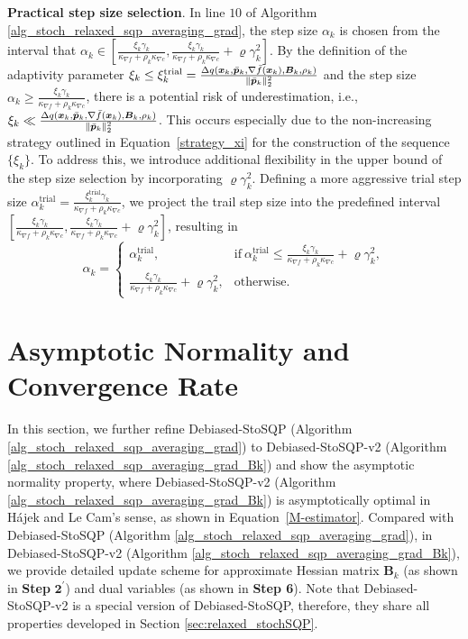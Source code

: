 \documentclass[aos]{imsart}
\numberwithin{equation}{section}
\theoremstyle{plain}
\begin{document}
\textbf{Practical step size selection}. In line $10$ of  Algorithm \ref{alg_stoch_relaxed_sqp_averaging_grad},
the step size $\alpha_k$ is chosen from the interval that $\alpha_k \in  \left[ \frac{ \xi_{k}\gamma_k}{\kappa_{\nabla f} + \rho_k \kappa_{\nabla c}} , \frac{ \xi_{k}\gamma_k}{\kappa_{\nabla f} + \rho_k \kappa_{\nabla c}} + \varrho \gamma_k^2 \right]$. 
By the definition of the adaptivity parameter $\xi_k \leq \xi_{k}^{\text{trial}} =  \frac{\Delta q(\bm{x}_k,\Bar{\bm{p}}_k, \nabla \Bar{f}(\bm{x}_k),\bm{B}_k,\rho_k)}{\|\Bar{\bm{p}}_k\|_2^2}$ and the step size $\alpha_k \geq \frac{ \xi_{k}\gamma_k}{\kappa_{\nabla f} + \rho_k \kappa_{\nabla c}} $, there is a potential risk of underestimation, i.e., $\xi_k \ll  \frac{\Delta q(\bm{x}_k,\Bar{\bm{p}}_k, \nabla \Bar{f}(\bm{x}_k),\bm{B}_k,\rho_k)}{\|\Bar{\bm{p}}_k\|_2^2}$. This occurs especially due to the non-increasing strategy outlined in Equation~\eqref{strategy_xi}
for the construction of the sequence $\{\xi_k\}$. To address this, we introduce additional flexibility in the upper bound of the step size selection by incorporating $\varrho \gamma_k^2$. Defining a more aggressive trial step size $\alpha_k^{\text{trial}} =  \frac{ \xi_{k}^{\text{trial}}\gamma_k}{\kappa_{\nabla f} + \rho_k \kappa_{\nabla c}} $, we project the trail step size into the predefined interval $\left[ \frac{ \xi_{k}\gamma_k}{\kappa_{\nabla f} + \rho_k \kappa_{\nabla c}}, \frac{ \xi_{k}\gamma_k}{\kappa_{\nabla f} + \rho_k \kappa_{\nabla c}} + \varrho \gamma_k^2 \right]$, resulting in 
\begin{equation}
    \alpha_k = \left\{ \begin{array}{cc}
       \alpha_k^{\text{trial}},  & \text{if}~\alpha_k^{\text{trial}} \leq \frac{ \xi_{k}\gamma_k}{\kappa_{\nabla f} + \rho_k \kappa_{\nabla c}} + \varrho \gamma_k^2, \\
       \frac{ \xi_{k}\gamma_k}{\kappa_{\nabla f} + \rho_k \kappa_{\nabla c}} + \varrho \gamma_k^2,  & \text{otherwise}. 
    \end{array} \right.
\end{equation}


\section{Asymptotic Normality and Convergence Rate}
\label{sec:asymptotic}


In this section, we further refine Debiased-StoSQP  (Algorithm \ref{alg_stoch_relaxed_sqp_averaging_grad}) to Debiased-StoSQP-v2 (Algorithm \ref{alg_stoch_relaxed_sqp_averaging_grad_Bk}) and show the asymptotic normality property, where Debiased-StoSQP-v2 (Algorithm \ref{alg_stoch_relaxed_sqp_averaging_grad_Bk}) is asymptotically optimal in H\'ajek and Le Cam's sense, as shown in Equation~\eqref{M-estimator}. 
Compared with Debiased-StoSQP (Algorithm \ref{alg_stoch_relaxed_sqp_averaging_grad}), in Debiased-StoSQP-v2 (Algorithm \ref{alg_stoch_relaxed_sqp_averaging_grad_Bk}), we provide detailed update scheme for approximate Hessian matrix $\bm{B}_k$ (as shown in \textbf{Step} $\mathbf{2^{\prime}}$) and dual variables (as shown in \textbf{Step 6}). Note that Debiased-StoSQP-v2 is a special version of Debiased-StoSQP, therefore, they share all properties developed in Section \ref{sec:relaxed_stochSQP}.
\end{document}
